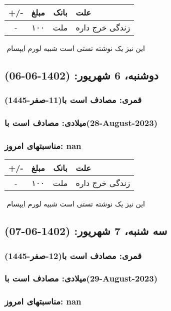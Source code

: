 \documentclass{article}
\newcommand{\rnote}[1]{\marginpar{\textcolor{color}{\StrSubstitute{\##1}{ }{\_}}}}
\newcommand{\myRow}[4]{
    #1 & #2 & #3 & #4 \\ \hline
}
\begin{document}
\begin{tabular}{ | c | c | c | p{5cm} |}
    \hline
    \myRow{ +/- }{مبلغ}{بانک}{علت}
    \myRow{-}{۱۰۰}{ملت}{زندگی خرج داره}
\end{tabular}
\newline
\newline

‌
\rnote{تست}
این نیز یک نوشته تستی است شبیه لورم ایپسام




\newpage
{}
\textcolor{color}{
\section{ دوشنبه، 6 شهریور: (1402-06-06) }
\subsubsection*{قمری: مصادف است با(11-صفر-1445)} 
\subsubsection*{میلادی: مصادف است با(28-August-2023)}
\subsubsection*{مناسبتهای امروز: nan}
}


\begin{tabular}{ | c | c | c | p{5cm} |}
    \hline
    \myRow{ +/- }{مبلغ}{بانک}{علت}
    \myRow{-}{۱۰۰}{ملت}{زندگی خرج داره}
\end{tabular}
\newline
\newline

‌
\rnote{تست}
این نیز یک نوشته تستی است شبیه لورم ایپسام




\newpage
{}
\textcolor{color}{
\section{ سه شنبه، 7 شهریور: (1402-06-07) }
\subsubsection*{قمری: مصادف است با(12-صفر-1445)} 
\subsubsection*{میلادی: مصادف است با(29-August-2023)}
\subsubsection*{مناسبتهای امروز: nan}
}
\end{document}
